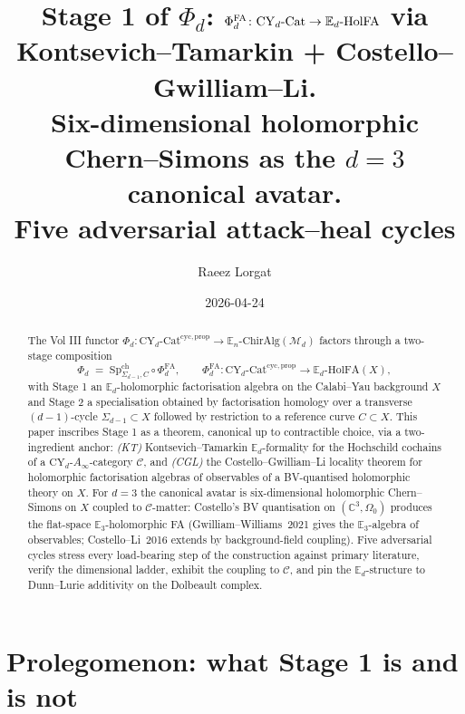 \documentclass[11pt]{article}
\title{Stage 1 of $\Phi_d$: $\Phi^{\FA}_d\colon \mathrm{CY}_d\text{-Cat}\to
       \mathbb{E}_d\text{-}\HolFA$ via Kontsevich--Tamarkin + Costello--Gwilliam--Li.
       \\ Six-dimensional holomorphic Chern--Simons as the $d=3$ canonical avatar.
       \\ Five adversarial attack--heal cycles}
\author{Raeez Lorgat}
\date{2026-04-24}
\theoremstyle{definition}
\providecommand{\CC}{\mathbb{C}}
\providecommand{\cC}{\mathcal{C}}
\providecommand{\cM}{\mathcal{M}}
\providecommand{\FA}{\mathrm{FA}}
\providecommand{\HolFA}{\mathrm{HolFA}}
\begin{document}
\maketitle

\begin{abstract}
The Vol III functor
$\Phi_d\colon \mathrm{CY}_d\text{-Cat}^{\mathrm{cyc},\mathrm{prop}}
\to \mathbb{E}_n\text{-ChirAlg}(\cM_d)$
factors through a two-stage composition
\[
\Phi_d \;=\; \mathrm{Sp}^{\mathrm{ch}}_{\Sigma_{d-1}, C}\circ \Phi^{\FA}_d,
\qquad
\Phi^{\FA}_d\colon \mathrm{CY}_d\text{-Cat}^{\mathrm{cyc},\mathrm{prop}}
\longrightarrow \mathbb{E}_d\text{-}\HolFA(X),
\]
with Stage 1 an $\mathbb{E}_d$-holomorphic factorisation algebra on the
Calabi--Yau background $X$ and Stage 2 a specialisation obtained by
factorisation homology over a transverse $(d-1)$-cycle $\Sigma_{d-1}
\subset X$ followed by restriction to a reference curve $C\subset X$.
This paper inscribes Stage 1 as a theorem, canonical up to contractible
choice, via a two-ingredient anchor: \emph{(KT)} Kontsevich--Tamarkin
$\mathbb{E}_d$-formality for the Hochschild cochains of a
$\mathrm{CY}_d$-$A_\infty$-category $\cC$, and \emph{(CGL)} the
Costello--Gwilliam--Li locality theorem for holomorphic factorisation
algebras of observables of a BV-quantised holomorphic theory on $X$.
For $d=3$ the canonical avatar is six-dimensional holomorphic
Chern--Simons on $X$ coupled to $\cC$-matter: Costello's BV
quantisation on $(\CC^3, \Omega_0)$ produces the flat-space
$\mathbb{E}_3$-holomorphic FA (Gwilliam--Williams~2021 gives the
$\mathbb{E}_3$-algebra of observables; Costello--Li~2016 extends by
background-field coupling). Five adversarial cycles stress every load-bearing
step of the construction against primary literature, verify the
dimensional ladder, exhibit the coupling to $\cC$, and pin the
$\mathbb{E}_d$-structure to Dunn--Lurie additivity on the Dolbeault
complex.
\end{abstract}

\section*{Prolegomenon: what Stage 1 is and is not}
\end{document}
